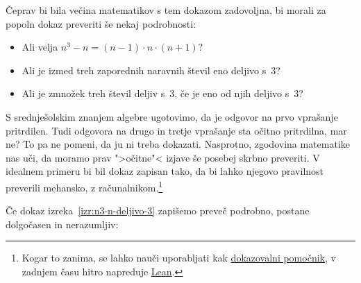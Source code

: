 \noindent
Čeprav bi bila
večina matematikov s tem dokazom zadovoljna, bi morali za popoln dokaz
preveriti še nekaj podrobnosti:
%
\begin{itemize}
\item Ali velja $n^3 - n = (n-1) \cdot n \cdot (n+1)$?
\item Ali je izmed treh zaporednih naravnih števil eno deljivo s~$3$?
\item Ali je zmnožek treh števil deljiv s~$3$, če je eno od njih deljivo s~$3$?
\end{itemize}
%
S srednješolskim znanjem algebre ugotovimo, da je odgovor na prvo
vprašanje pritrdilen. Tudi odgovora na drugo in tretje vprašanje sta
očitno pritrdilna, mar ne? To pa ne pomeni, da ju ni treba dokazati.
Nasprotno, zgodovina matematike nas uči, da moramo prav ">očitne"<
izjave še posebej skrbno preveriti.
%
V idealnem primeru bi bil dokaz zapisan tako, da bi lahko njegovo pravilnost preverili mehansko, z
računalnikom.\footnote{Kogar to zanima, se lahko nauči uporabljati kak  \href{https://ncatlab.org/nlab/show/proof+assistant}{dokazovalni pomočnik}, v zadnjem času hitro napreduje \href{https://leanprover.github.io}{Lean}.}

Če dokaz izreka~\ref{izr:n3-n-deljivo-3} zapišemo preveč
podrobno, postane dolgočasen in ne\-ra\-zumljiv:

